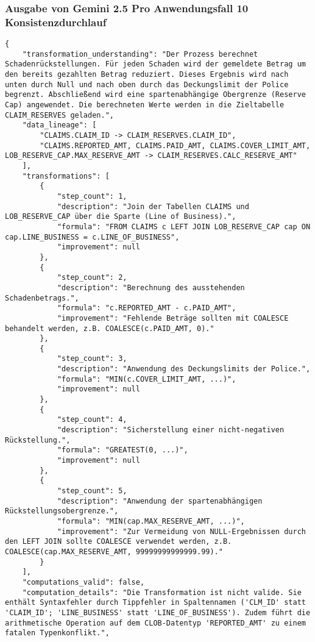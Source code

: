 \subsubsection{Ausgabe von Gemini 2.5 Pro Anwendungsfall 10 Konsistenzdurchlauf}\label{anhang:subsubsec:gemini_case10_prompt2}
\begin{lstlisting}[caption={Ausgabe: Gemini 2.5 Pro Anwendungsfall 10 Konsistenzdurchlauf},label={gemini_case10_prompt2}]
{
    "transformation_understanding": "Der Prozess berechnet Schadenrückstellungen. Für jeden Schaden wird der gemeldete Betrag um den bereits gezahlten Betrag reduziert. Dieses Ergebnis wird nach unten durch Null und nach oben durch das Deckungslimit der Police begrenzt. Abschließend wird eine spartenabhängige Obergrenze (Reserve Cap) angewendet. Die berechneten Werte werden in die Zieltabelle CLAIM_RESERVES geladen.",
    "data_lineage": [
        "CLAIMS.CLAIM_ID -> CLAIM_RESERVES.CLAIM_ID",
        "CLAIMS.REPORTED_AMT, CLAIMS.PAID_AMT, CLAIMS.COVER_LIMIT_AMT, LOB_RESERVE_CAP.MAX_RESERVE_AMT -> CLAIM_RESERVES.CALC_RESERVE_AMT"
    ],
    "transformations": [
        {
            "step_count": 1,
            "description": "Join der Tabellen CLAIMS und LOB_RESERVE_CAP über die Sparte (Line of Business).",
            "formula": "FROM CLAIMS c LEFT JOIN LOB_RESERVE_CAP cap ON cap.LINE_BUSINESS = c.LINE_OF_BUSINESS",
            "improvement": null
        },
        {
            "step_count": 2,
            "description": "Berechnung des ausstehenden Schadenbetrags.",
            "formula": "c.REPORTED_AMT - c.PAID_AMT",
            "improvement": "Fehlende Beträge sollten mit COALESCE behandelt werden, z.B. COALESCE(c.PAID_AMT, 0)."
        },
        {
            "step_count": 3,
            "description": "Anwendung des Deckungslimits der Police.",
            "formula": "MIN(c.COVER_LIMIT_AMT, ...)",
            "improvement": null
        },
        {
            "step_count": 4,
            "description": "Sicherstellung einer nicht-negativen Rückstellung.",
            "formula": "GREATEST(0, ...)",
            "improvement": null
        },
        {
            "step_count": 5,
            "description": "Anwendung der spartenabhängigen Rückstellungsobergrenze.",
            "formula": "MIN(cap.MAX_RESERVE_AMT, ...)",
            "improvement": "Zur Vermeidung von NULL-Ergebnissen durch den LEFT JOIN sollte COALESCE verwendet werden, z.B. COALESCE(cap.MAX_RESERVE_AMT, 99999999999999.99)."
        }
    ],
    "computations_valid": false,
    "computation_details": "Die Transformation ist nicht valide. Sie enthält Syntaxfehler durch Tippfehler in Spaltennamen ('CLM_ID' statt 'CLAIM_ID'; 'LINE_BUSINESS' statt 'LINE_OF_BUSINESS'). Zudem führt die arithmetische Operation auf dem CLOB-Datentyp 'REPORTED_AMT' zu einem fatalen Typenkonflikt.",

\end{lstlisting}
